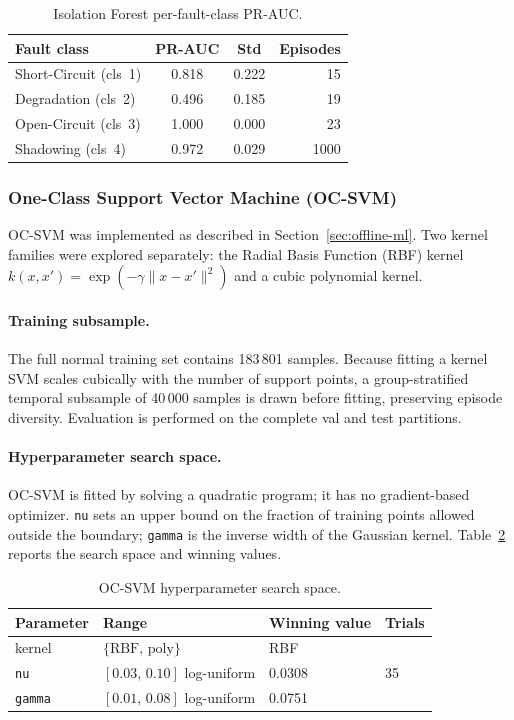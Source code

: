 \begin{table}[H]
\centering
\caption{Isolation Forest per-fault-class PR-AUC.\label{tab:iforest-per-class}}
\begin{tabular}{lccr}
\toprule
\textbf{Fault class} & \textbf{PR-AUC} & \textbf{Std} & \textbf{Episodes} \\
\midrule
Short-Circuit (cls~1) & 0.818 & 0.222 & 15 \\
Degradation   (cls~2) & 0.496 & 0.185 & 19 \\
Open-Circuit  (cls~3) & 1.000 & 0.000 & 23 \\
Shadowing     (cls~4) & 0.972 & 0.029 & 1000 \\
\bottomrule
\end{tabular}
\end{table}

\subsubsection{One-Class Support Vector Machine (OC-SVM)}

OC-SVM was implemented as described in Section~\ref{sec:offline-ml}. Two kernel families were explored separately: the Radial Basis Function (RBF) kernel $k(x,x') = \exp(-\gamma\|x-x'\|^2)$ and a cubic polynomial kernel.

\paragraph{Training subsample.}
The full normal training set contains 183\,801 samples. Because fitting a kernel SVM scales cubically with the number of support points, a group-stratified temporal subsample of 40\,000 samples is drawn before fitting, preserving episode diversity. Evaluation is performed on the complete val and test partitions.

\paragraph{Hyperparameter search space.}
OC-SVM is fitted by solving a quadratic program; it has no gradient-based optimizer. \texttt{nu} sets an upper bound on the fraction of training points allowed outside the boundary; \texttt{gamma} is the inverse width of the Gaussian kernel. Table~\ref{tab:ocsvm-hpo} reports the search space and winning values.
\begin{table}[H]
\centering
\caption{OC-SVM hyperparameter search space.\label{tab:ocsvm-hpo}}
\begin{tabular}{llll}
\toprule
\textbf{Parameter} & \textbf{Range} & \textbf{Winning value} & \textbf{Trials} \\
\midrule
kernel         & $\{\text{RBF},\,\text{poly}\}$  & RBF                 & \multirow{3}{*}{35} \\
\texttt{nu}    & $[0.03,\,0.10]$ log-uniform     & 0.0308              & \\
\texttt{gamma} & $[0.01,\,0.08]$ log-uniform     & 0.0751              & \\
\bottomrule
\end{tabular}
\end{table}

